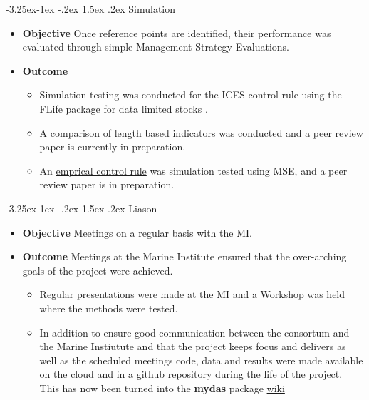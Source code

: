 \documentclass[a4paper, 10pt]{article}
\makeatletter
\renewcommand{\subsection}{\@startsection{subsection}{2}{\z@}%
 {-3.25ex\@plus -1ex \@minus -.2ex}%
 {1.5ex \@plus .2ex}%
 {\normalfont\bfseries\slshape}}
\makeatother
\begin{document}
\newpage
\subsection{Simulation}

\begin{itemize}[labelindent=\parindent,noitemsep,topsep=0pt,parsep=0pt,partopsep=0pt]
 \item \textbf{Objective} Once reference points are identified, their performance was evaluated through simple Management Strategy Evaluations.
 \item \textbf{Outcome} 
 \begin{itemize}
 \item Simulation testing was conducted for the ICES control rule using the FLife package for data limited stocks \citep{fischer2019hcr}.
 \item A comparison of \href{https://3o2y9wugzp1kfxr5hvzgzq-on.drv.tw/MyDas/papers/roc/roc.html}{length based indicators} was conducted and a peer review paper is currently in preparation.
 \item An \href{https://3o2y9wugzp1kfxr5hvzgzq-on.drv.tw/MyDas/papers/pareto/pareto.html}{emprical control rule} was simulation tested using MSE, and a peer review paper is in preparation.
  \end{itemize} 
\end{itemize}


\subsection{Liason}

\begin{itemize}[labelindent=\parindent,noitemsep,topsep=0pt,parsep=0pt,partopsep=0pt]
 \item \textbf{Objective} Meetings on a regular basis with the MI.
 \item \textbf{Outcome} 
 Meetings at the Marine Institute ensured that the over-arching goals of the project were achieved.
 \begin{itemize}
  \item  Regular \href{https://3o2y9wugzp1kfxr5hvzgzq-on.drv.tw/MyDas/presentations.html}{presentations} were made at the MI and a Workshop was held where the methods were tested.
 \item In addition to ensure good communication between the consortum and the Marine Instiutute and that the project keeps focus and delivers as well as the scheduled meetings code, data and results were made available on the cloud and in a github repository during the life of the project. This has now been turned into the \textbf{mydas} package \href{https://github.com/flr/mydAS/wiki}{wiki}
 \end{itemize}
\end{itemize}
\end{document}
